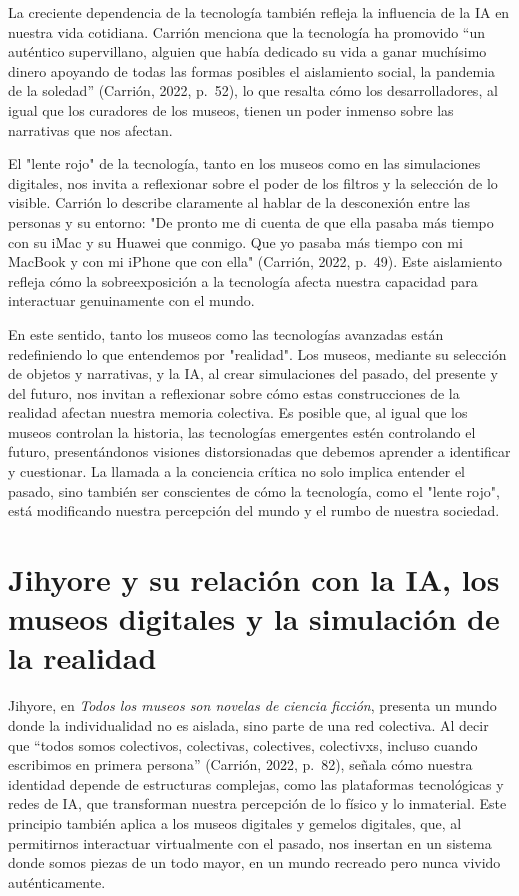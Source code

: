 \documentclass[
  spanish,
  11pt,
  a4paper,
]{scrbook}
\begin{document}
La creciente dependencia de la tecnología también refleja la influencia
de la IA en nuestra vida cotidiana. Carrión menciona que la tecnología
ha promovido ``un auténtico supervillano, alguien que había dedicado su
vida a ganar muchísimo dinero apoyando de todas las formas posibles el
aislamiento social, la pandemia de la soledad'' (Carrión, 2022, p.~52),
lo que resalta cómo los desarrolladores, al igual que los curadores de
los museos, tienen un poder inmenso sobre las narrativas que nos
afectan.

El "lente rojo" de la tecnología, tanto en los museos como en las
simulaciones digitales, nos invita a reflexionar sobre el poder de los
filtros y la selección de lo visible. Carrión lo describe claramente al
hablar de la desconexión entre las personas y su entorno: "De pronto me
di cuenta de que ella pasaba más tiempo con su iMac y su Huawei que
conmigo. Que yo pasaba más tiempo con mi MacBook y con mi iPhone que con
ella" (Carrión, 2022, p.~49). Este aislamiento refleja cómo la
sobreexposición a la tecnología afecta nuestra capacidad para
interactuar genuinamente con el mundo.

En este sentido, tanto los museos como las tecnologías avanzadas están
redefiniendo lo que entendemos por "realidad". Los museos, mediante su
selección de objetos y narrativas, y la IA, al crear simulaciones del
pasado, del presente y del futuro, nos invitan a reflexionar sobre cómo
estas construcciones de la realidad afectan nuestra memoria colectiva.
Es posible que, al igual que los museos controlan la historia, las
tecnologías emergentes estén controlando el futuro, presentándonos
visiones distorsionadas que debemos aprender a identificar y cuestionar.
La llamada a la conciencia crítica no solo implica entender el pasado,
sino también ser conscientes de cómo la tecnología, como el "lente
rojo", está modificando nuestra percepción del mundo y el rumbo de
nuestra sociedad.

\section*{Jihyore y su relación con la IA, los museos digitales y la
simulación de la
realidad}\label{jihyore-y-su-relaciuxf3n-con-la-ia-los-museos-digitales-y-la-simulaciuxf3n-de-la-realidad}


Jihyore, en \emph{Todos los museos son novelas de ciencia ficción},
presenta un mundo donde la individualidad no es aislada, sino parte de
una red colectiva. Al decir que ``todos somos colectivos, colectivas,
colectives, colectivxs, incluso cuando escribimos en primera persona''
(Carrión, 2022, p.~82), señala cómo nuestra identidad depende de
estructuras complejas, como las plataformas tecnológicas y redes de IA,
que transforman nuestra percepción de lo físico y lo inmaterial. Este
principio también aplica a los museos digitales y gemelos digitales,
que, al permitirnos interactuar virtualmente con el pasado, nos insertan
en un sistema donde somos piezas de un todo mayor, en un mundo recreado
pero nunca vivido auténticamente.
\end{document}
